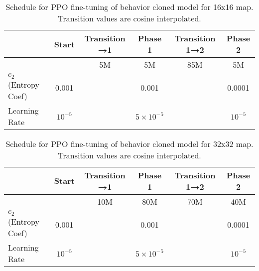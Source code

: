 \documentclass[conference]{IEEEtran}
\newcounter{supptable}
\newenvironment{supptable}
  {\renewcommand{\tablename}{Supplemental Table}\setcounter{table}{\value{supptable}}\addtocounter{supptable}{1}\begin{table}}
  {\end{table}\setcounter{supptable}{\value{table}}}
\begin{document}
\begin{supptable}[H]
    \caption{Schedule for PPO fine-tuning of behavior cloned model for 16x16 map. Transition values are cosine interpolated.}
    \label{tab:bc-ppo-schedule-map16}
    \begin{center}
    \begin{tabular}{lccccc}
    & Start & Transition →1 & Phase 1 & Transition 1→2 & Phase 2 \\
    \midrule
    &  & 5M & 5M & 85M & 5M \\
    $c_2$ (Entropy Coef) & 0.001 &  & 0.001 &  & 0.0001 \\
    Learning Rate & $10^{-5}$ &  & $5 \times 10^{-5}$ &  & $10^{-5}$ \\
    \end{tabular}
\end{center}
\end{supptable}

\begin{supptable}[H]
    \caption{Schedule for PPO fine-tuning of behavior cloned model for 32x32 map. Transition values are cosine interpolated.}
    \label{tab:bc-ppo-schedule-map32}
    \begin{center}
    \begin{tabular}{lccccc}
    & Start & Transition →1 & Phase 1 & Transition 1→2 & Phase 2 \\
    \midrule
    &  & 10M & 80M & 70M & 40M \\
    $c_2$ (Entropy Coef) & 0.001 &  & 0.001 &  & 0.0001 \\
    Learning Rate & $10^{-5}$ &  & $5 \times 10^{-5}$ &  & $10^{-5}$ \\
    \end{tabular}
\end{center}
\end{supptable}
\end{document}
